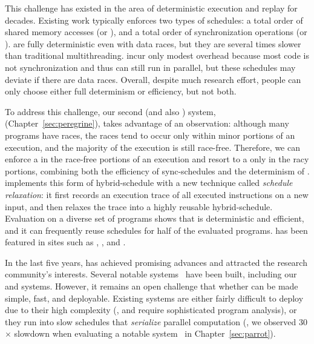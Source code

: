 This challenge has existed in the area of deterministic
execution and replay for decades. Existing work typically enforces two types of
schedules: a total order of shared memory accesses (or \emph{\memsched}), and a
total order of synchronization operations (or \emph{\syncsched}). \Memscheds 
are fully deterministic even with data races, but they are several
times slower than traditional multithreading. \Syncscheds incur only modest
overhead because most code is not synchronization and thus can still run in
parallel, but these schedules may deviate if there are data races. Overall,
despite much research effort, people can only choose either full determinism 
or efficiency, but not both.

To address this challenge, our second \smt (and also \dmt) system,
\peregrine (Chapter~\ref{sec:peregrine}), takes advantage of
an observation: although many programs have races, the races tend to occur
only within minor portions of an execution, and the majority of the execution is
still race-free. Therefore, we can enforce a \syncsched in the race-free
portions of an execution and resort to a \memsched only in the racy portions,
combining both the efficiency of sync-schedules and the determinism of \memscheds. 
\peregrine implements this form of hybrid-schedule with a new technique called
\emph{schedule relaxation}: it first records an execution trace of
all executed instructions on a new input, and then relaxes the trace into a
highly reusable hybrid-schedule. Evaluation on a diverse set of programs shows
that \peregrine is deterministic and efficient, and it can frequently reuse
schedules for half of the evaluated programs. \peregrine has been featured in
sites such as \acmtechnews, \tgdaily, and \physorg.

 In the last
five years, \smt has achieved promising advances and attracted the research
community's interests. Several notable \smt systems~\cite{determinator:osdi10,
cui:tern:osdi10, peregrine:sosp11, dthreads:sosp11, bergan:oopsla13} have been
built, including our \tern and \peregrine systems. However, it remains an open
challenge that whether \smt can be made simple, fast, and deployable. Existing 
\smt systems are either fairly difficult to deploy due to their high complexity 
(\eg, \tern and \peregrine require sophisticated program analysis), or they run 
into slow schedules that \emph{serialize} parallel computation (\eg, we 
observed 30$\times$ slowdown when evaluating a notable 
system~\cite{dthreads:sosp11} in Chapter~\ref{sec:parrot}).

